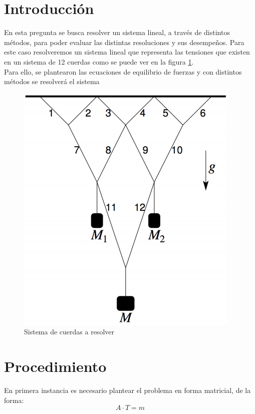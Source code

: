 \documentclass[a4paper, 11pt, spanish]{article}
\begin{document}
\section{Introducci\'on}
En esta pregunta se busca resolver un sistema lineal, a través de distintos métodos, para poder evaluar las distintas resoluciones y sus desempeños. Para este caso resolveremos un sistema lineal que representa las tensiones que existen en un sistema de 12 cuerdas como se puede ver en la figura \ref{cuerdas}.\\

Para ello, se plantearon las ecuaciones de equilibrio de fuerzas y con distintos métodos se resolverá el sistema
\begin{figure}[h]
\centering
\includegraphics[scale=0.7]{cuerdas.png}
\caption{Sistema de cuerdas a resolver}
\label{cuerdas} 
\end{figure} 

\section{Procedimiento}
En primera instancia es necesario plantear el problema en forma matricial, de la forma:
\begin{equation}
A \cdot T = m
\end{equation}
\end{document}
